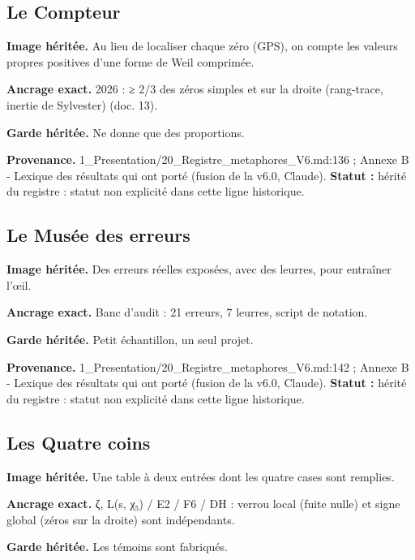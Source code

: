 \documentclass[
  9pt,
  a4paper,
]{article}
\begin{document}
\hypertarget{le-compteur}{%
\subsection{Le Compteur}\label{le-compteur}}

\textbf{Image héritée.} Au lieu de localiser chaque zéro (GPS), on
compte les valeurs propres positives d'une forme de Weil comprimée.

\textbf{Ancrage exact.} 2026 : ≥ 2/3 des zéros simples et sur la droite
(rang-trace, inertie de Sylvester) (doc. 13).

\textbf{Garde héritée.} Ne donne que des proportions.

\textbf{Provenance.} 1\_Presentation/20\_Registre\_metaphores\_V6.md:136
; Annexe B - Lexique des résultats qui ont porté (fusion de la v6.0,
Claude). \textbf{Statut :} hérité du registre : statut non explicité
dans cette ligne historique.

\hypertarget{le-musuxe9e-des-erreurs}{%
\subsection{Le Musée des erreurs}\label{le-musuxe9e-des-erreurs}}

\textbf{Image héritée.} Des erreurs réelles exposées, avec des leurres,
pour entraîner l'œil.

\textbf{Ancrage exact.} Banc d'audit : 21 erreurs, 7 leurres, script de
notation.

\textbf{Garde héritée.} Petit échantillon, un seul projet.

\textbf{Provenance.} 1\_Presentation/20\_Registre\_metaphores\_V6.md:142
; Annexe B - Lexique des résultats qui ont porté (fusion de la v6.0,
Claude). \textbf{Statut :} hérité du registre : statut non explicité
dans cette ligne historique.

\hypertarget{les-quatre-coins}{%
\subsection{Les Quatre coins}\label{les-quatre-coins}}

\textbf{Image héritée.} Une table à deux entrées dont les quatre cases
sont remplies.

\textbf{Ancrage exact.} ζ, L(s, χ₅) / E2 / F6 / DH : verrou local (fuite
nulle) et signe global (zéros sur la droite) sont indépendants.

\textbf{Garde héritée.} Les témoins sont fabriqués.
\end{document}
